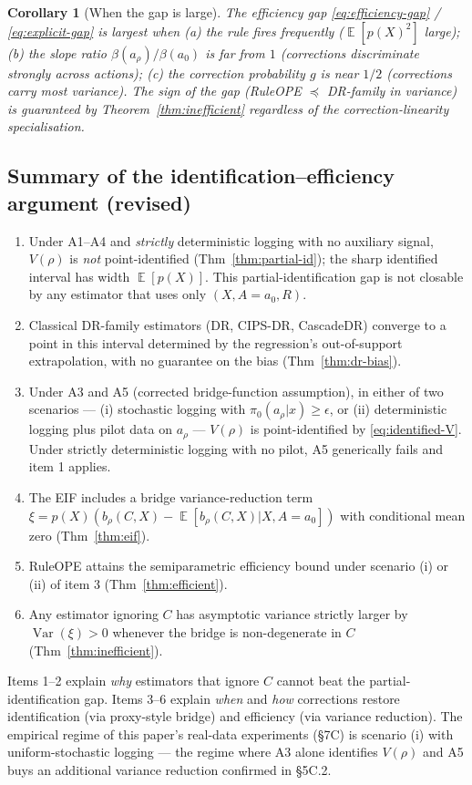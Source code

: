 \documentclass[11pt]{article}
\newtheorem{corollary}[theorem]{Corollary}
\DeclareMathOperator{\E}{\mathbb{E}}
\DeclareMathOperator{\Var}{Var}
\begin{document}
\begin{corollary}[When the gap is large]
The efficiency gap \eqref{eq:efficiency-gap} / \eqref{eq:explicit-gap}
is largest when
(a) the rule fires frequently ($\E[p(X)^2]$ large);
(b) the slope ratio $\beta(a_\rho)/\beta(a_0)$ is far from $1$
(corrections discriminate strongly across actions);
(c) the correction probability $g$ is near $1/2$ (corrections carry
most variance).  The \emph{sign} of the gap (RuleOPE $\preceq$
DR-family in variance) is guaranteed by
Theorem~\ref{thm:inefficient} regardless of the correction-linearity
specialisation.
\end{corollary}

\subsection{Summary of the identification--efficiency argument (revised)}

\begin{enumerate}
\item Under A1--A4 and \emph{strictly} deterministic logging with no
  auxiliary signal, $V(\rho)$ is \emph{not} point-identified
  (Thm~\ref{thm:partial-id}); the sharp identified interval has
  width $\E[p(X)]$.  This partial-identification gap is not closable
  by any estimator that uses only $(X, A = a_0, R)$.
\item Classical DR-family estimators (DR, CIPS-DR, CascadeDR) converge
  to a point in this interval determined by the regression's
  out-of-support extrapolation, with no guarantee on the bias
  (Thm~\ref{thm:dr-bias}).
\item Under A3 and A5 (corrected bridge-function assumption), in
  either of two scenarios --- (i) stochastic logging with
  $\pi_0(a_\rho | x) \ge \epsilon$, or (ii) deterministic logging
  plus pilot data on $a_\rho$ --- $V(\rho)$ is point-identified
  by \eqref{eq:identified-V}.  Under strictly deterministic logging
  with no pilot, A5 generically fails and item 1 applies.
\item The EIF includes a bridge variance-reduction term
  $\xi = p(X)(b_\rho(C, X) - \E[b_\rho(C, X) | X, A = a_0])$ with
  conditional mean zero (Thm~\ref{thm:eif}).
\item RuleOPE attains the semiparametric efficiency bound under
  scenario (i) or (ii) of item 3 (Thm~\ref{thm:efficient}).
\item Any estimator ignoring $C$ has asymptotic variance strictly
  larger by $\Var(\xi) > 0$ whenever the bridge is non-degenerate
  in $C$ (Thm~\ref{thm:inefficient}).
\end{enumerate}
Items 1--2 explain \emph{why} estimators that ignore $C$ cannot beat
the partial-identification gap.  Items 3--6 explain \emph{when} and
\emph{how} corrections restore identification (via proxy-style
bridge) and efficiency (via variance reduction).  The empirical
regime of this paper's real-data experiments (§7C) is scenario (i)
with uniform-stochastic logging --- the regime where A3 alone
identifies $V(\rho)$ and A5 buys an additional variance reduction
confirmed in §5C.2.
\end{document}
